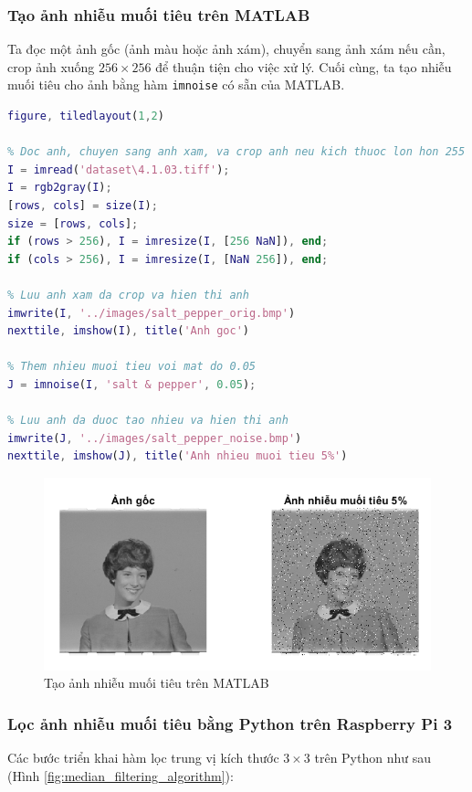 \subsubsection{Tạo ảnh nhiễu muối tiêu trên MATLAB}

Ta đọc một ảnh gốc (ảnh màu hoặc ảnh xám), chuyển sang ảnh xám nếu cần, crop ảnh xuống $256 \times 256$ để thuận tiện cho việc xử lý. Cuối cùng, ta tạo nhiễu muối tiêu cho ảnh bằng hàm \texttt{imnoise} có sẵn của MATLAB.

\begin{lstlisting}[language=MATLAB]
figure, tiledlayout(1,2)

% Doc anh, chuyen sang anh xam, va crop anh neu kich thuoc lon hon 255
I = imread('dataset\4.1.03.tiff');
I = rgb2gray(I);
[rows, cols] = size(I);
size = [rows, cols];
if (rows > 256), I = imresize(I, [256 NaN]), end;
if (cols > 256), I = imresize(I, [NaN 256]), end;

% Luu anh xam da crop va hien thi anh
imwrite(I, '../images/salt_pepper_orig.bmp')
nexttile, imshow(I), title('Anh goc')

% Them nhieu muoi tieu voi mat do 0.05
J = imnoise(I, 'salt & pepper', 0.05);

% Luu anh da duoc tao nhieu va hien thi anh
imwrite(J, '../images/salt_pepper_noise.bmp')
nexttile, imshow(J), title('Anh nhieu muoi tieu 5%')
\end{lstlisting}

\begin{figure}[H]
    \centering
    \includegraphics[width=.75\linewidth]{../images/salt_pepper_noise_matlab.png}
    \caption{Tạo ảnh nhiễu muối tiêu trên MATLAB}
\end{figure}

\subsubsection{Lọc ảnh nhiễu muối tiêu bằng Python trên Raspberry Pi 3}

Các bước triển khai hàm lọc trung vị kích thước $3 \times 3$ trên Python như sau (Hình \ref{fig:median_filtering_algorithm}):

